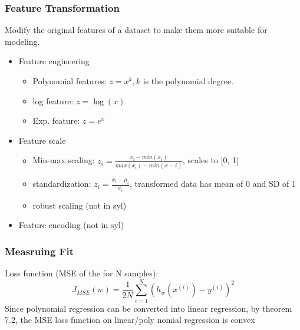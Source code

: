\documentclass{article}
\begin{document}
\subsubsection*{Feature Transformation}
Modify the original features of a dataset to make them more suitable for modeling.
\begin{itemize}
    \item Feature engineering
        \begin{itemize}
            \item Polynomial features: $z = x^k, k$ is the polynomial degree.
            \item log feature: $z = \log(x)$
            \item Exp. feature: $z = e^x$
        \end{itemize}
    \item Feature scale
        \begin{itemize}
            \item Min-max scaling: $z_i = \frac{x_i - min(x_i)}{max(x_i) - min(x-i)}$, scales to [0, 1]
            \item standardization: $z_i = \frac{x_i - \mu_i}{\sigma_i}$, transformed data has mean of 0 and SD of 1
            \item robust scaling (not in syl)
        \end{itemize}
    \item Feature encoding (not in syl)
\end{itemize}

\subsubsection*{Measruing Fit}
Loss function (MSE of the for N samples):
\begin{equation}
    J_{MSE}(w) = \frac{1}{2N}\sum_{i=1}^{N} (h_w(x^{(i)}) - y^{(i)})^2   
\end{equation}
Since polynomial regression can be converted into linear regression, by theorem 7.2, the MSE loss function on linear/poly
nomial regression is convex
\end{document}
